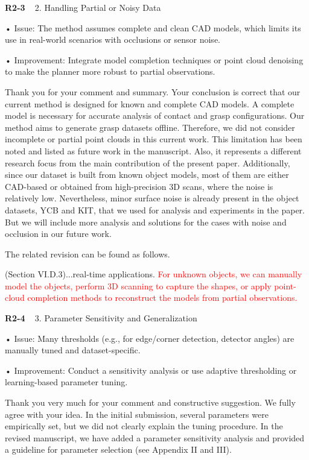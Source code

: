\documentclass[journal]{IEEEtran}
\newcommand{\rev}[1]{\textcolor{red}{#1}}
\begin{document}
\bigskip

\noindent
{\textbf{\color{black}R2-3 }\color{gray}~
2. Handling Partial or Noisy Data

• Issue: The method assumes complete and clean CAD models, which limits its use in real-world scenarios with occlusions or sensor noise.

• Improvement: Integrate model completion techniques or point cloud denoising to make the planner more robust to partial observations.
}

Thank you for your comment and summary. Your conclusion is correct that our current method is designed for known and complete CAD models. A complete model is necessary for accurate analysis of contact and grasp configurations. Our method aims to generate grasp datasets offline. Therefore, we did not consider incomplete or partial point clouds in this current work. This limitation has been noted and listed as future work in the manuscript. Also, it represents a different research focus from the main contribution of the present paper. Additionally, since our dataset is built from known object models, most of them are either CAD-based or obtained from high-precision 3D scans, where the noise is relatively low. Nevertheless, minor surface noise is already present in the object datasets, YCB and KIT, that we used for analysis and experiments in the paper. But we will include more analysis and solutions for the cases with noise and occlusion in our future work. 

The related revision can be found as follows.

(Section VI.D.3)...real-time applications. 
\rev{For unknown objects, we can manually model the objects, perform 3D scanning to capture the shapes, or apply point-cloud completion methods to reconstruct the models from partial observations.}

\bigskip

\noindent
{\textbf{\color{black}R2-4 }\color{gray}~
3. Parameter Sensitivity and Generalization

• Issue: Many thresholds (e.g., for edge/corner detection, detector angles) are manually tuned and dataset-specific.

• Improvement: Conduct a sensitivity analysis or use adaptive thresholding or learning-based parameter tuning.
}

Thank you very much for your comment and constructive suggestion. We fully agree with your idea. In the initial submission, several parameters were empirically set, but we did not clearly explain the tuning procedure. In the revised manuscript, we have added a parameter sensitivity analysis and provided a guideline for parameter selection (see Appendix II and III). 
\end{document}
